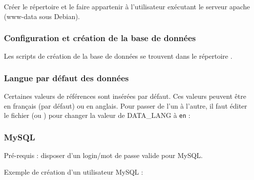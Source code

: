 

Créer le répertoire et le faire appartenir à l'utilisateur exécutant le serveur apache (www-data sous Debian).



\subsubsection{Configuration et création de la base de données}

Les scripts de création de la base de données se trouvent dans le
répertoire .

\subsubsection*{Langue par défaut des données}

Certaines valeurs de références sont insérées par défaut. Ces valeurs
peuvent être en français (par défaut) ou en anglais. Pour passer de
l'un à l'autre, il faut éditer le fichier
 (ou
) pour changer la
valeur de DATA\_LANG à \texttt{en} : 


\subsubsection{MySQL}

Pré-requis : disposer d'un login/mot de passe valide pour MySQL.

Exemple de création d'un utilisateur MySQL : 

